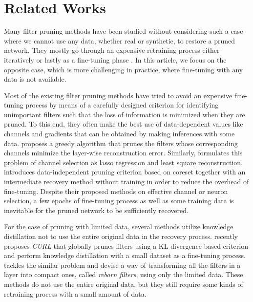 \section{Related Works}
\label{sec:related}
Many filter pruning methods have been studied without considering such a case where we cannot use any data, whether real or synthetic, to restore a pruned network. They mostly go through an expensive retraining process either iteratively \cite{Soft,FPGM,Dynamic,ZhangF24} or lastly as a fine-tuning phase \cite{GlobalRanking,Importance,NISP}. In this article, we focus on the opposite case, which is more challenging in practice, where fine-tuning with any data is not available.

Most of the existing filter pruning methods have tried to avoid an expensive fine-tuning process by means of a carefully designed criterion for identifying unimportant filters such that the loss of information is minimized when they are pruned. To this end, they often make the best use of data-dependent values like channels and gradients that can be obtained by making inferences with some data. \cite{Thinet} proposes a greedy algorithm that prunes the filters whose corresponding channels minimize the layer-wise reconstruction error. Similarly, \cite{Lasso} formulates this problem of channel selection as lasso regression and least square reconstruction.  \cite{CoreSet_ICLR} introduces data-independent pruning criterion based on coreset together with an intermediate recovery method without training in order to reduce the overhead of fine-tuning. Despite their proposed methods on effective channel or neuron selection, a few epochs of fine-tuning process as well as some training data is inevitable for the pruned network to be sufficiently recovered. 


For the case of pruning with limited data, several methods \cite{CURL,Reborn} utilize knowledge distillation \cite{Knowledge_Distilation} not to use the entire original data in the recovery process. \cite{CURL} recently proposes \textit{CURL} that globally prunes filters using a KL-divergence based criterion and perform knowledge distillation with a small dataset as a fine-tuning process. \cite{Reborn} tackles the similar problem and devise a way of transforming all the filters in a layer into compact ones, called \textit{reborn filters}, using only the limited data. These methods do not use the entire original data, but they still require some kinds of retraining process with a small amount of data. 

